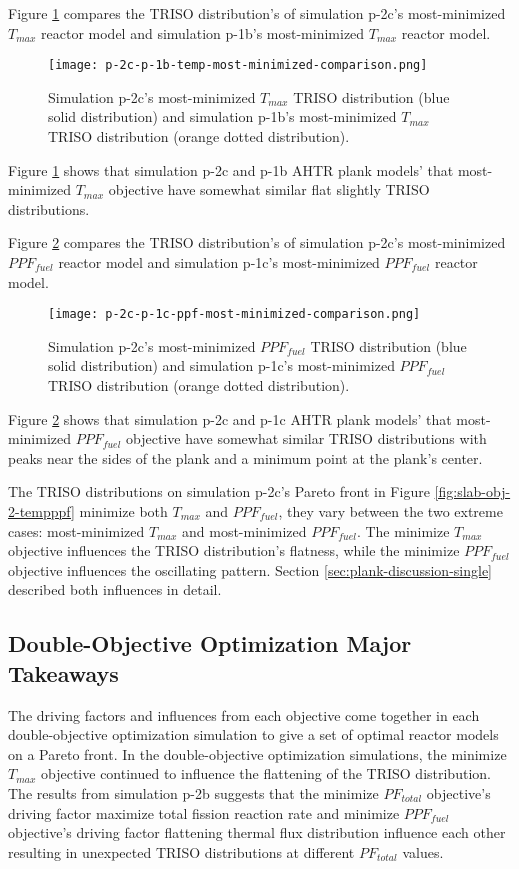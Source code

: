 Figure \ref{fig:p-2c-temp-triso-comparison} compares the TRISO distribution's of 
simulation p-2c's most-minimized $T_{max}$ reactor model and simulation p-1b's 
most-minimized $T_{max}$ reactor model. 
\begin{figure}[htbp!]
    \centering
    \texttt{[image: p-2c-p-1b-temp-most-minimized-comparison.png]} 
    \caption{Simulation p-2c's most-minimized $T_{max}$ TRISO distribution (blue 
    solid distribution) and simulation p-1b's most-minimized $T_{max}$ TRISO 
    distribution (orange dotted distribution).}
    \label{fig:p-2c-temp-triso-comparison}
\end{figure}
Figure \ref{fig:p-2c-temp-triso-comparison} shows that simulation p-2c and 
p-1b AHTR plank models' that most-minimized $T_{max}$ objective have 
somewhat similar flat slightly TRISO distributions.  

Figure \ref{fig:p-2c-ppf-triso-comparison} compares the TRISO distribution's of 
simulation p-2c's most-minimized $PPF_{fuel}$ reactor model and simulation p-1c's 
most-minimized $PPF_{fuel}$ reactor model. 
\begin{figure}[htbp!]
    \centering
    \texttt{[image: p-2c-p-1c-ppf-most-minimized-comparison.png]} 
    \caption{Simulation p-2c's most-minimized $PPF_{fuel}$ TRISO distribution (blue 
    solid distribution) and simulation p-1c's most-minimized $PPF_{fuel}$ TRISO 
    distribution (orange dotted distribution).}
    \label{fig:p-2c-ppf-triso-comparison}
\end{figure}
Figure \ref{fig:p-2c-ppf-triso-comparison} shows that simulation p-2c and 
p-1c AHTR plank models' that most-minimized $PPF_{fuel}$ objective have 
somewhat similar TRISO distributions with peaks near the sides of the plank and a 
minimum point at the plank's center. 

The \gls{TRISO} distributions on simulation p-2c's Pareto front in Figure 
\ref{fig:slab-obj-2-tempppf} minimize both $T_{max}$ and $PPF_{fuel}$, they vary 
between the two extreme cases: most-minimized $T_{max}$ and most-minimized 
$PPF_{fuel}$. 
The minimize $T_{max}$ objective influences the TRISO distribution's flatness, while 
the minimize $PPF_{fuel}$ objective influences the oscillating pattern.
Section \ref{sec:plank-discussion-single} described both influences in detail. 

\subsection{Double-Objective Optimization Major Takeaways}
The driving factors and influences from each objective come together in 
each double-objective optimization simulation to give a set of optimal reactor models 
on a Pareto front. 
In the double-objective optimization simulations, the minimize $T_{max}$ objective 
continued to influence the flattening of the TRISO distribution. 
The results from simulation p-2b suggests that the minimize $PF_{total}$ 
objective's driving factor maximize total fission reaction rate and 
minimize $PPF_{fuel}$ objective's driving factor flattening thermal flux distribution 
influence each other resulting in unexpected TRISO distributions at different 
$PF_{total}$ values. 

